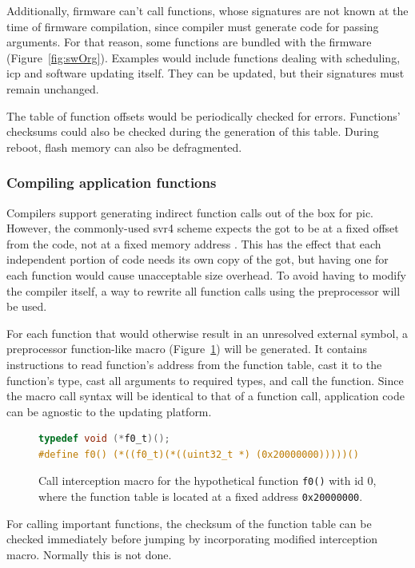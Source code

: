 Additionally, firmware can't call functions, whose signatures are not known at the time of firmware compilation, since compiler must generate code for passing arguments. For that reason, some functions are bundled with the firmware (Figure~\ref{fig:swOrg}). Examples would include functions dealing with scheduling, \gls{icp} and software updating itself. They can be updated, but their signatures must remain unchanged.

The table of function offsets would be periodically checked for errors. Functions' checksums could also be checked during the generation of this table. During reboot, flash memory can also be defragmented.

\subsubsection{Compiling application functions}

Compilers support generating indirect function calls out of the box for \gls{pic}. However, the commonly-used \gls{svr4} scheme expects the \gls{got} to be at a fixed offset from the code, not at a fixed memory address \cite[Chapter~8]{Levine1999}. This has the effect that each independent portion of code needs its own copy of the \gls{got}, but having one for each function would cause unacceptable size overhead. To avoid having to modify the compiler itself, a way to rewrite all function calls using the preprocessor will be used.

For each function that would otherwise result in an unresolved external symbol, a preprocessor function-like macro (Figure~\ref{fig:macro}) will be generated. It contains instructions to read function's address from the function table, cast it to the function's type, cast all arguments to required types, and call the function. Since the macro call syntax will be identical to that of a function call, application code can be agnostic to the updating platform.

\begin{figure} [htb]
\begin{lstlisting}[language=C]
typedef void (*f0_t)();
#define f0() (*((f0_t)(*((uint32_t *) (0x20000000)))))()
\end{lstlisting}
\caption{Call interception macro for the hypothetical function \texttt{f0()} with id 0, where the function table is located at a fixed address \texttt{0x20000000}.}
\label{fig:macro}
\end{figure}

For calling important functions, the checksum of the function table can be checked immediately before jumping by incorporating modified interception macro. Normally this is not done.

